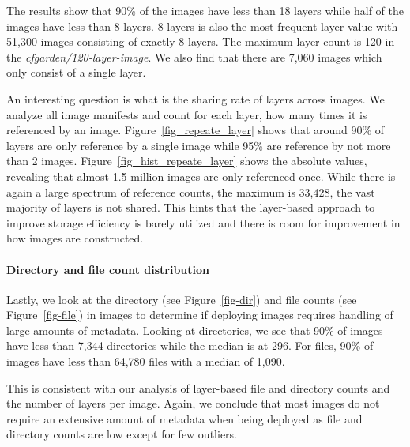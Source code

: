 The results show that 90\% of the images have less than 18 layers while
half of the images have less than 8 layers. 8 layers is also the most
frequent layer value with 51,300 images consisting of exactly 8 layers.
The maximum layer count is 120 in the \textit{cfgarden/120-layer-image}.
We also find that there are 7,060 images which only consist of a single layer.




An interesting question is what is the sharing rate of layers across images.
We analyze all image manifests and count for each layer, how many times it
is referenced by an image. Figure~\ref{fig_repeate_layer} shows that around 90\%
of layers are only reference by a single image while 95\% are reference by not
more than 2 images.
%
Figure~\ref{fig_hist_repeate_layer} shows the absolute values, revealing that
almost 1.5 million images are only referenced once. While there is again a large
spectrum of reference counts, the maximum is 33,428, the vast majority of layers
is not shared. This hints that the layer-based approach to improve storage
efficiency is barely utilized and there is room for improvement in how images
are constructed.




\paragraph{Directory and file count distribution}



Lastly, we look at the directory (see Figure~\ref{fig-dir}) and file counts
(see Figure~\ref{fig-file}) in images to determine if deploying
images requires handling of large amounts of metadata. Looking at directories,
we see that 90\% of images have less than 7,344 directories while the median
is at 296. For files, 90\% of images have less than 64,780 files with a median
of 1,090.

This is consistent with our analysis of layer-based file and directory counts
and the number of layers per image. Again, we conclude that most images
do not require an extensive amount of metadata when being deployed as file and
directory counts are low except for few outliers.


